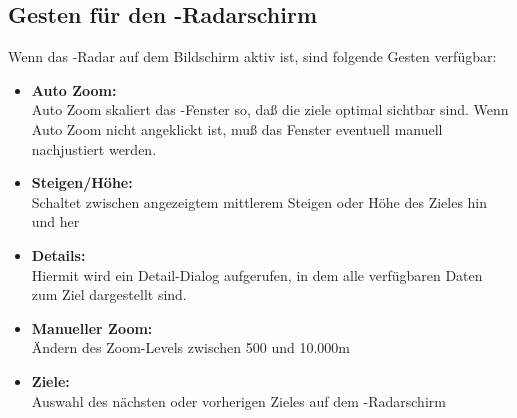 \subsection*{Gesten für den \fl-Radarschirm}
Wenn das \fl-Radar auf dem Bildschirm aktiv ist, sind folgende Gesten verfügbar: 

\begin{itemize}\itemsep1.25em
\item[] \textbf{Auto Zoom:}\\  Auto Zoom skaliert das \fl-Fenster so, daß die ziele optimal sichtbar sind. Wenn Auto Zoom nicht angeklickt ist, muß das Fenster eventuell manuell nachjustiert werden. 
\item[] \textbf{Steigen/Höhe:}\\ Schaltet zwischen angezeigtem mittlerem Steigen oder Höhe des Zieles hin und her
\item[] \textbf{Details:}\\ Hiermit wird ein Detail-Dialog  aufgerufen, in dem alle verfügbaren Daten zum Ziel dargestellt sind.  
\item[] \textbf{Manueller Zoom:}\\ Ändern des Zoom-Levels zwischen 500 und 10.000m
\item[] \textbf{Ziele:}\\ Auswahl des nächsten oder vorherigen Zieles auf dem \fl-Radarschirm
\end{itemize}



